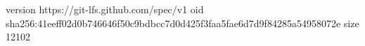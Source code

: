 version https://git-lfs.github.com/spec/v1
oid sha256:41eeff02d0b746646f50c9bdbcc7d0d425f3faa5fae6d7d9f84285a54958072e
size 12102
